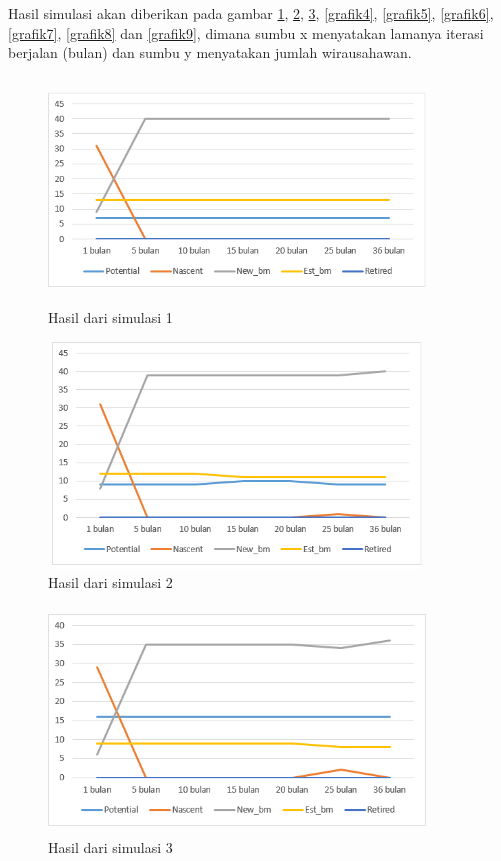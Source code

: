 Hasil simulasi akan diberikan pada gambar \ref{grafik1}, \ref{grafik2}, \ref{grafik3}, \ref{grafik4}, \ref{grafik5}, \ref{grafik6}, \ref{grafik7}, \ref{grafik8} dan \ref{grafik9}, dimana sumbu x menyatakan lamanya iterasi berjalan (bulan) dan sumbu y menyatakan jumlah wirausahawan.
	\begin{figure} [H]
	\centering  
	\includegraphics[width=10cm, height=6cm]{grafik1} 
		\caption[Hasil dari simulasi 1]{Hasil dari simulasi 1}
	\label{grafik1} 
\end{figure}

	\begin{figure} [H]
	\centering  
	\includegraphics[width=10cm, height=6cm]{grafik2} 
		\caption[Hasil dari simulasi 2]{Hasil dari simulasi 2}
	\label{grafik2} 
\end{figure}

	\begin{figure} [H]
	\centering  
	\includegraphics[width=10cm, height=6cm]{grafik3} 
		\caption[Hasil dari simulasi 3]{Hasil dari simulasi 3}
	\label{grafik3} 
\end{figure}

